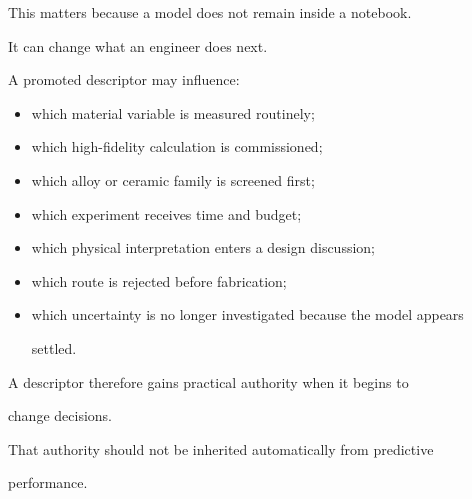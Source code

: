\documentclass[11pt,a4paper,oneside]{report}
\begin{document}
This matters because a model does not remain inside a notebook.



It can change what an engineer does next.



A promoted descriptor may influence:



\begin{itemize}



\item

which material variable is measured routinely;



\item

which high-fidelity calculation is commissioned;



\item

which alloy or ceramic family is screened first;



\item

which experiment receives time and budget;



\item

which physical interpretation enters a design discussion;



\item

which route is rejected before fabrication;



\item

which uncertainty is no longer investigated because the model appears

settled.



\end{itemize}



A descriptor therefore gains practical authority when it begins to

change decisions.



That authority should not be inherited automatically from predictive

performance.
\end{document}
